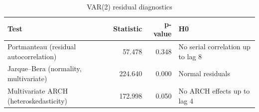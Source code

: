\begin{table}

\caption{\label{tab:diagnostics}VAR(2) residual diagnostics}
\centering
\begin{tabular}[t]{lrrl}
\toprule
Test & Statistic & p-value & H0\\
\midrule
Portmanteau (residual autocorrelation) & 57.478 & 0.348 & No serial correlation up to lag 8\\
Jarque--Bera (normality, multivariate) & 224.640 & 0.000 & Normal residuals\\
Multivariate ARCH (heteroskedasticity) & 172.998 & 0.050 & No ARCH effects up to lag 4\\
\bottomrule
\end{tabular}
\end{table}
